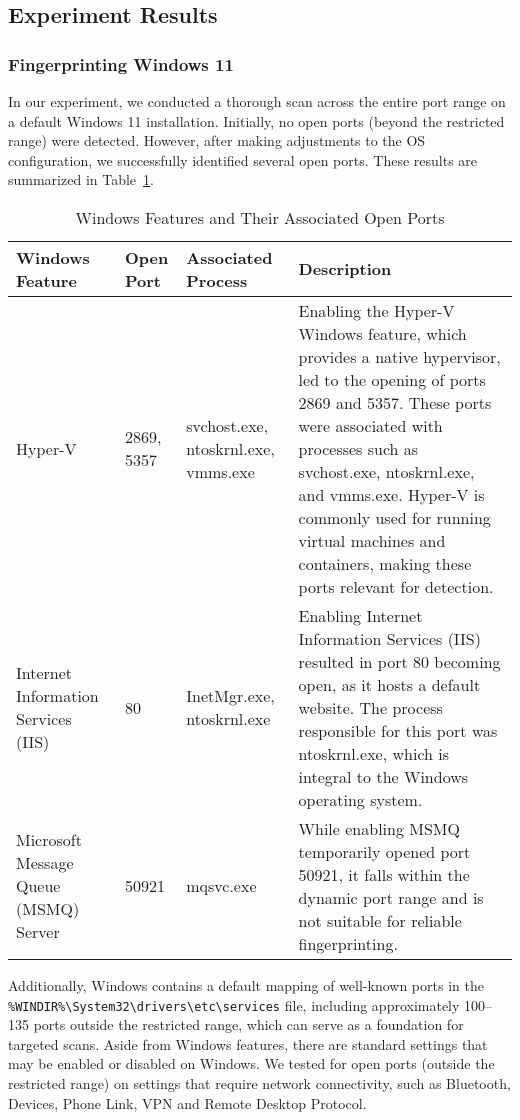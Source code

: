 \subsection{Experiment Results}

\subsubsection{Fingerprinting Windows 11}
\label{section:win11-fingerprint}

In our experiment, we conducted a thorough scan across the entire port range on a default Windows 11 installation. Initially, no open ports (beyond the restricted range) were detected. However, after making adjustments to the OS configuration, we successfully identified several open ports. These results are summarized in Table~\ref{tab:windows-features-open-ports}.

\begin{table}[htbp]
\footnotesize
\centering
\begin{tabular}{p{4cm}p{1cm}p{2cm}p{8cm}}
    \toprule
    Windows Feature & Open Port & Associated Process & Description \\
     \midrule
     Hyper-V & 2869, 5357 & svchost.exe, ntoskrnl.exe, vmms.exe & Enabling the Hyper-V Windows feature, which provides a native hypervisor, led to the opening of ports 2869 and 5357. These ports were associated with processes such as svchost.exe, ntoskrnl.exe, and vmms.exe. Hyper-V is commonly used for running virtual machines and containers, making these ports relevant for detection. \\
     
     Internet Information Services (IIS) & 80 & InetMgr.exe, ntoskrnl.exe & Enabling Internet Information Services (IIS) resulted in port 80 becoming open, as it hosts a default website. The process responsible for this port was ntoskrnl.exe, which is integral to the Windows operating system. \\
     
     Microsoft Message Queue (MSMQ) Server & 50921 & mqsvc.exe & While enabling MSMQ temporarily opened port 50921, it falls within the dynamic port range and is not suitable for reliable fingerprinting. \\
     \bottomrule
\end{tabular}
\caption{Windows Features and Their Associated Open Ports}
\label{tab:windows-features-open-ports}
\end{table}

Additionally, Windows contains a default mapping of well-known ports in the 
\texttt{\%WINDIR\%\textbackslash System32\textbackslash drivers\textbackslash etc\textbackslash services} file, including approximately 100–135 ports outside the restricted range, which can serve as a foundation for targeted scans.
Aside from Windows features, there are standard settings that may be enabled or disabled on Windows. We tested for open ports (outside the restricted range) on settings that require network connectivity, such as Bluetooth, Devices, Phone Link, VPN and Remote Desktop Protocol.


